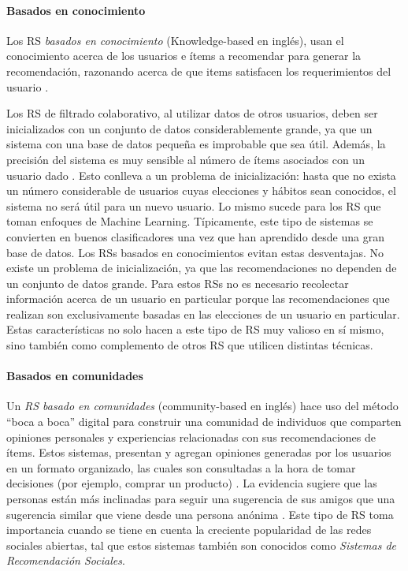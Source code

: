 \paragraph{Basados en conocimiento}
Los RS \textit{basados en conocimiento} (Knowledge-based en inglés), usan el conocimiento acerca de los usuarios e ítems a recomendar para generar la recomendación, razonando acerca de que items satisfacen los requerimientos del usuario \citep{burke2000knowledge}.

\bigskip Los RS de filtrado colaborativo, al utilizar datos de otros usuarios, deben ser inicializados con un conjunto de datos considerablemente grande, ya que un sistema con una base de datos pequeña es improbable que sea útil. Además, la precisión del sistema es muy sensible al número de ítems asociados con un usuario dado \citep{shardanand1995social}. Esto conlleva a un problema de inicialización: hasta que no exista un número considerable de usuarios cuyas elecciones y hábitos sean conocidos, el sistema no será útil para un nuevo usuario.  Lo mismo sucede para los RS que toman enfoques de Machine Learning. Típicamente, este tipo de sistemas se convierten en buenos clasificadores una vez que han aprendido desde una gran base de datos. Los RSs basados en conocimientos evitan estas desventajas. No existe un problema de inicialización, ya que las recomendaciones no dependen de un conjunto de datos grande. Para estos RSs no es necesario recolectar información acerca de un usuario en particular porque las recomendaciones que realizan son exclusivamente basadas en las elecciones de un usuario en particular. Estas características no solo hacen a este tipo de RS muy valioso en sí mismo, sino también como complemento de otros RS que utilicen distintas técnicas. 

\paragraph{Basados en comunidades}
Un \textit{RS basado en comunidades} (community-based en inglés) hace uso del método “boca a boca” digital para construir una comunidad de individuos que comparten opiniones personales y experiencias relacionadas con sus recomendaciones de ítems. Estos sistemas, presentan y agregan opiniones generadas por los usuarios en un formato organizado, las cuales son consultadas a la hora de tomar decisiones (por ejemplo, comprar un producto) \citep{chen2009community}. La evidencia sugiere que las personas están más inclinadas para seguir una sugerencia de sus amigos que una sugerencia similar que viene desde una persona anónima \citep{sinha2001comparing}. Este tipo de RS toma importancia cuando se tiene en cuenta la creciente popularidad de las redes sociales abiertas, tal que estos sistemas también son conocidos como \textit{Sistemas de Recomendación Sociales}.

